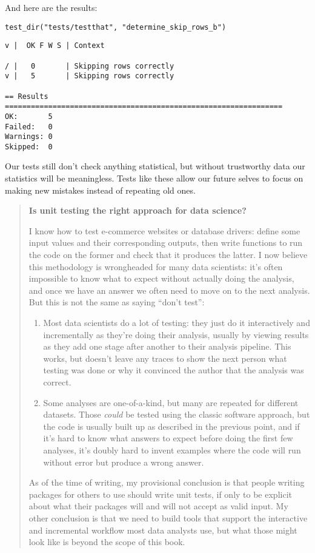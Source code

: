 \noindent
And here are the results:

\begin{lstlisting}
test_dir("tests/testthat", "determine_skip_rows_b")
\end{lstlisting}

\begin{lstlisting}
v |  OK F W S | Context

/ |   0       | Skipping rows correctly
v |   5       | Skipping rows correctly

== Results ================================================================
OK:       5
Failed:   0
Warnings: 0
Skipped:  0
\end{lstlisting}

Our tests still don't check anything statistical,
but without trustworthy data our statistics will be meaningless.
Tests like these allow our future selves to focus on making new mistakes
instead of repeating old ones.

\begin{quote}
\textbf{Is unit testing the right approach for data science?}

I know how to test e-commerce websites or database drivers:
define some input values and their corresponding outputs,
then write functions to run the code on the former
and check that it produces the latter.
I now believe this methodology is wrongheaded for many data scientists:
it's often impossible to know what to expect without actually doing the analysis,
and once we have an answer we often need to move on to the next analysis.
But this is not the same as saying ``don't test'':

\begin{enumerate}
\item
  Most data scientists do a lot of testing:
  they just do it interactively and incrementally as they're doing their analysis,
  usually by viewing results as they add one stage after another
  to their analysis pipeline.
  This works,
  but doesn't leave any traces to show the next person
  what testing was done
  or why it convinced the author that the analysis was correct.

\item
  Some analyses are one-of-a-kind,
  but many are repeated for different datasets.
  Those \emph{could} be tested using the classic software approach,
  but the code is usually built up as described in the previous point,
  and if it's hard to know what answers to expect before doing the first few analyses,
  it's doubly hard to invent examples where the code will run without error
  but produce a wrong answer.
\end{enumerate}

As of the time of writing,
my provisional conclusion is that
people writing packages for others to use should write unit tests,
if only to be explicit about what their packages will and will not accept as valid input.
My other conclusion is that we need to build tools that support
the interactive and incremental workflow most data analysts use,
but what those might look like is beyond the scope of this book.
\end{quote}

